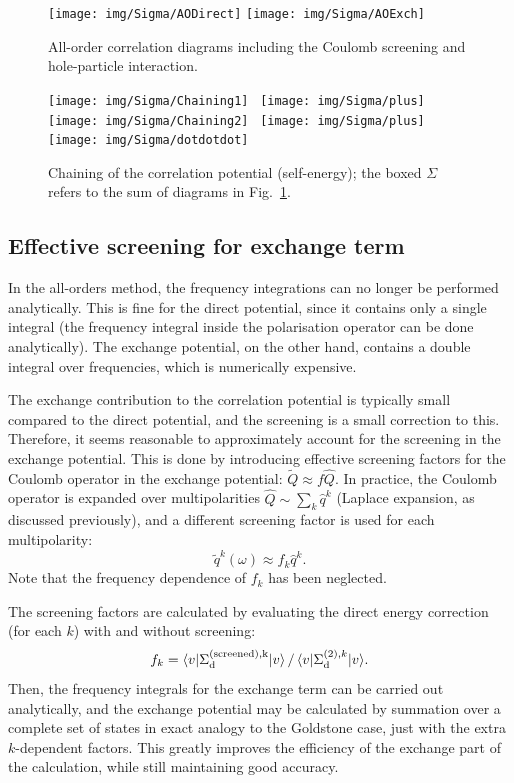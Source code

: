 \documentclass[10pt,twocolumn,a4paper]{article}%
\newcommand{\bra}[1]{\ensuremath{\langle #1|}}	%
\newcommand{\ket}[1]{\ensuremath{|#1\rangle}}	%
\newcommand{\be}{\begin{equation}}
\newcommand{\ee}{\end{equation}}
\newcommand{\w}{\ensuremath{\omega}}
\begin{document}
\begin{figure}%
\centering
\texttt{[image: img/Sigma/AODirect]}
\texttt{[image: img/Sigma/AOExch]}
\caption{\label{fig:SigmaAO-Feyn}\small All-order correlation diagrams including the Coulomb screening and hole-particle interaction.}
\end{figure}

\begin{figure}[b]
\centering
\texttt{[image: img/Sigma/Chaining1]}~
\texttt{[image: img/Sigma/plus]}~
\texttt{[image: img/Sigma/Chaining2]}~
\texttt{[image: img/Sigma/plus]}~
\texttt{[image: img/Sigma/dotdotdot]}
\caption{\label{fig:Chaining}\small Chaining of the correlation potential (self-energy); the boxed $\Sigma$ refers to the sum of diagrams in Fig.~\ref{fig:SigmaAO-Feyn}.}
\end{figure}






\subsection{Effective screening for exchange term}\label{sec:AllOrder-effectiveScreening}


In the all-orders method, the frequency integrations can no longer be performed analytically.
This is fine for the direct potential, since it contains only a single integral (the frequency integral inside the polarisation operator can be done analytically).
The exchange potential, on the other hand, contains a double integral over frequencies, which is numerically expensive.

The exchange contribution to the correlation potential is typically small compared to the direct potential, and the screening is a small correction to this.
Therefore, it seems reasonable to approximately account for the screening in the exchange potential.
This is done by introducing effective screening factors for the Coulomb operator in the exchange potential: $\widetilde Q\approx f\hat Q$.
%
In practice, the Coulomb operator is expanded over multipolarities $\hat Q\sim\sum_k \hat q^k$ (Laplace expansion, as discussed previously), and a different screening factor is used for each multipolarity:
\be
\widetilde q^k(\w)\approx f_k \hat q^k.
\ee
Note that the frequency dependence of $f_k$ has been neglected.

The screening factors are calculated by evaluating the direct energy correction (for each $k$) with and without screening:
\be
f_k = {\bra{v}\Sigma^{\rm(screened),k}_{\rm d}\ket{v} \, / \, \bra{v}\Sigma^{(2),k}_{\rm d}\ket{v}}.
\ee
Then, the frequency integrals for the exchange term can be carried out analytically, and the exchange potential may be calculated by summation over a complete set of states in exact analogy to the Goldstone case, just with the extra $k$-dependent factors.
This greatly improves the efficiency of the exchange part of the calculation, while still maintaining good accuracy.
\end{document}
